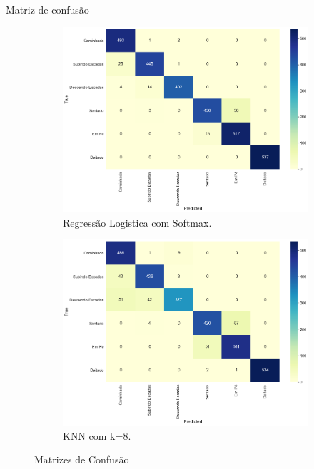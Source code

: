 \documentclass[12pt]{article}
\begin{document}
Matriz de confusão
\begin{figure}[H]
	\begin{subfigure}{0.49\linewidth}
		\centering
		\includegraphics[width=\linewidth]{images/conf_m_2_lr.png}
		\caption{Regressão Logistica com Softmax.}
		\label{fig:conf_m_2_lr_c}
	\end{subfigure}
	\hfill
	\begin{subfigure}{0.49\linewidth}
		\centering
		\includegraphics[width=\linewidth]{images/conf_m_2_k.png}
		\caption{KNN com k=8.}
		\label{fig:conf_m_2_k_c}
	\end{subfigure}
	\caption{Matrizes de Confusão}
	\label{fig:comp}
\end{figure}
\end{document}
